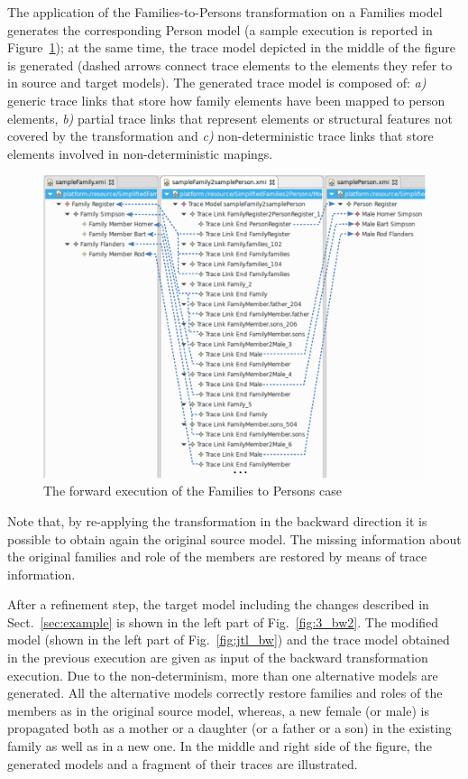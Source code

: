 The application of the Families-to-Persons transformation on a Families model generates the corresponding Person model (a sample execution is reported in Figure~\ref{fig:jtl_fw}); at the same time, the trace model depicted in the middle of the figure is generated (dashed arrows connect trace elements to the elements they refer to in source and target models). The generated trace model is composed of: 
\emph{a)} generic trace links %
that store how family elements have been mapped to person elements,
\emph{b)} partial trace links that represent elements or structural features not covered by the transformation and \emph{c)} non-deterministic trace links that store elements involved in non-deterministic mapings.


\begin{figure}[h]
	\center
	\includegraphics[width=.5\textwidth]{diagrams/solutions/jtl_fw}
	\caption{The forward execution of the Families to Persons case}
	\label{fig:jtl_fw}
\end{figure}


Note that, by re-applying the transformation in the backward direction it is possible to obtain again the original source model. The missing information about the original families and role of the members are restored by means of trace information.


After a refinement step, the target model including the changes described in Sect.~\ref{sec:example} is shown in the left part of Fig.~\ref{fig:3_bw2}. 
The modified model (shown in the left part of Fig.~\ref{fig:jtl_bw}) and the trace model obtained in the previous execution are given as input of the backward transformation execution.
Due to the non-determinism, more than one alternative models are generated. All the alternative models correctly restore families and roles of the members as in the original
source model, whereas, a new female (or male) is propagated both as a mother or a daughter (or a father or a son) in the existing family as well as in a new one. 
%
In the middle and right side of the figure, the generated models and a fragment of their traces are illustrated. 


